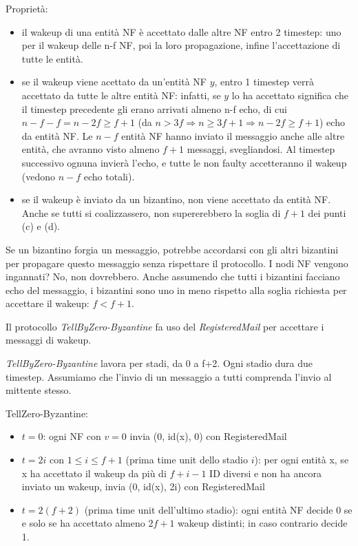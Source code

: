 Proprietà:
\begin{itemize}
  \item il wakeup di una entità NF è accettato dalle altre NF entro 2 timestep: uno per il wakeup delle n-f NF, poi
  la loro propagazione, infine l'accettazione di tutte le entità.
  \item se il wakeup viene acettato da un'entità NF $y$, entro 1 timestep verrà accettato da tutte le altre entità NF: infatti,
  se $y$ lo ha accettato significa che il timestep precedente gli erano arrivati almeno n-f echo, di cui $n-f-f = n-2f \geq f+1$
  (da $n > 3f \Rightarrow n \geq 3f + 1 \Rightarrow n-2f \geq f+1$) echo da entità NF. Le $n-f$ entità NF hanno inviato il messaggio
  anche alle altre entità, che avranno visto almeno $f+1$ messaggi, svegliandosi. Al timestep successivo ognuna invierà l'echo, e tutte le non
  faulty accetteranno il wakeup (vedono $n-f$ echo totali).
  \item se il wakeup è inviato da un bizantino, non viene accettato da entità NF. Anche se tutti si coalizzassero, non supererebbero la soglia di $f+1$
  dei punti (c) e (d).
\end{itemize}

Se un bizantino forgia un messaggio, potrebbe accordarsi con gli altri bizantini per propagare questo messaggio senza rispettare il protocollo.
I nodi NF vengono ingannati? No, non dovrebbero. Anche assumendo che tutti i bizantini facciano echo del messaggio,
i bizantini sono uno in meno rispetto alla soglia richiesta per accettare il wakeup: $f < f+1$.

Il protocollo \textit{TellByZero-Byzantine} fa uso del \textit{RegisteredMail} per accettare i messaggi di wakeup.

\textit{TellByZero-Byzantine} lavora per stadi, da 0 a f+2. Ogni stadio dura due timestep. Assumiamo che l'invio di un messaggio a tutti comprenda
l'invio al mittente stesso.

TellZero-Byzantine:
\begin{itemize}
  \item $t=0$: ogni NF con $v=0$ invia (0, id(x), 0) con RegisteredMail
  \item $t = 2i$ con $1 \leq i \leq f+1$ (prima time unit dello stadio $i$): per ogni entità x, se x ha accettato il wakeup da più di $f+i-1$ ID diversi e
  non ha ancora inviato un wakeup, invia (0, id(x), 2i) con RegisteredMail
  \item $t = 2(f+2)$ (prima time unit dell'ultimo stadio): ogni entità NF decide 0 se e solo se ha accettato almeno $2f+1$ wakeup distinti;
  in caso contrario decide 1.
\end{itemize}

